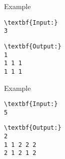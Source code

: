 Example  
\begin{verbatim}
\textbf{Input:}
3
\end{verbatim}
\begin{verbatim}
\textbf{Output:}
1
1 1 1
1 1 1\end{verbatim}
   Example  
\begin{verbatim}
\textbf{Input:}
5
\end{verbatim}
\begin{verbatim}
\textbf{Output:}
2
1 1 2 2 2
2 1 2 1 2\end{verbatim}